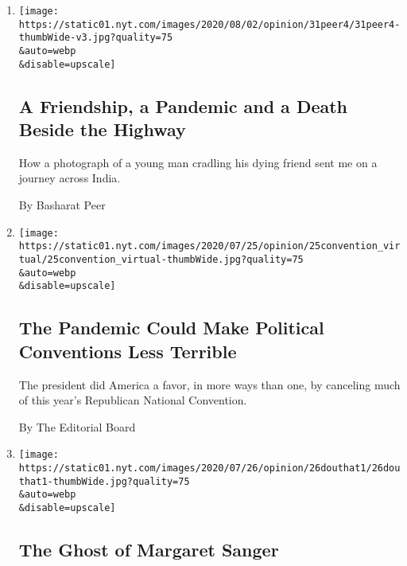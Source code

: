 \begin{enumerate}
\def\labelenumi{\arabic{enumi}.}
\item
  \href{/2020/07/31/opinion/sunday/India-migration-coronavirus.html}{}

  \texttt{[image: https://static01.nyt.com/images/2020/08/02/opinion/31peer4/31peer4-thumbWide-v3.jpg?quality=75\\\&auto=webp\\\&disable=upscale]}

  \hypertarget{a-friendship-a-pandemic-and-a-death-beside-the-highway}{%
  \subsection{A Friendship, a Pandemic and a Death Beside the
  Highway}\label{a-friendship-a-pandemic-and-a-death-beside-the-highway}}

  How a photograph of a young man cradling his dying friend sent me on a
  journey across India.

  By Basharat Peer
\item
  \href{/2020/07/25/opinion/sunday/republican-convention-trump.html}{}

  \texttt{[image: https://static01.nyt.com/images/2020/07/25/opinion/25convention\_virtual/25convention\_virtual-thumbWide.jpg?quality=75\\\&auto=webp\\\&disable=upscale]}

  \hypertarget{the-pandemic-could-make-political-conventions-less-terrible}{%
  \subsection{The Pandemic Could Make Political Conventions Less
  Terrible}\label{the-pandemic-could-make-political-conventions-less-terrible}}

  The president did America a favor, in more ways than one, by canceling
  much of this year's Republican National Convention.

  By The Editorial Board
\item
  \href{/2020/07/25/opinion/sunday/abortion-racism-margaret-sanger.html}{}

  \texttt{[image: https://static01.nyt.com/images/2020/07/26/opinion/26douthat1/26douthat1-thumbWide.jpg?quality=75\\\&auto=webp\\\&disable=upscale]}

  \hypertarget{the-ghost-of-margaret-sanger}{%
  \subsection{The Ghost of Margaret
  Sanger}\label{the-ghost-of-margaret-sanger}}


\end{enumerate}
